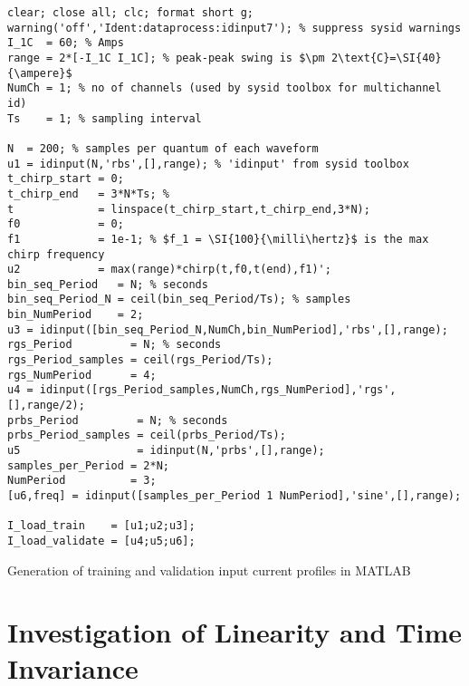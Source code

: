 \begin{listing}[!htbp]
\begin{verbatim}
clear; close all; clc; format short g;
warning('off','Ident:dataprocess:idinput7'); % suppress sysid warnings
I_1C  = 60; % Amps
range = 2*[-I_1C I_1C]; % peak-peak swing is $\pm 2\text{C}=\SI{40}{\ampere}$
NumCh = 1; % no of channels (used by sysid toolbox for multichannel id)
Ts    = 1; % sampling interval

N  = 200; % samples per quantum of each waveform
u1 = idinput(N,'rbs',[],range); % 'idinput' from sysid toolbox
t_chirp_start = 0;
t_chirp_end   = 3*N*Ts; %
t             = linspace(t_chirp_start,t_chirp_end,3*N);
f0            = 0;
f1            = 1e-1; % $f_1 = \SI{100}{\milli\hertz}$ is the max chirp frequency
u2            = max(range)*chirp(t,f0,t(end),f1)';
bin_seq_Period   = N; % seconds
bin_seq_Period_N = ceil(bin_seq_Period/Ts); % samples
bin_NumPeriod    = 2;
u3 = idinput([bin_seq_Period_N,NumCh,bin_NumPeriod],'rbs',[],range);
rgs_Period         = N; % seconds
rgs_Period_samples = ceil(rgs_Period/Ts);
rgs_NumPeriod      = 4;
u4 = idinput([rgs_Period_samples,NumCh,rgs_NumPeriod],'rgs',[],range/2);
prbs_Period         = N; % seconds
prbs_Period_samples = ceil(prbs_Period/Ts);
u5                  = idinput(N,'prbs',[],range);
samples_per_Period = 2*N;
NumPeriod          = 3;
[u6,freq] = idinput([samples_per_Period 1 NumPeriod],'sine',[],range);

I_load_train    = [u1;u2;u3];
I_load_validate = [u4;u5;u6];
\end{verbatim}
\caption{Generation of training and validation input current profiles in
\textsc{MATLAB}}
\label{codesnippet:trainvalidsysidinput}
\end{listing}

\section{Investigation of Linearity and Time Invariance}\label{sec:lticheck}

